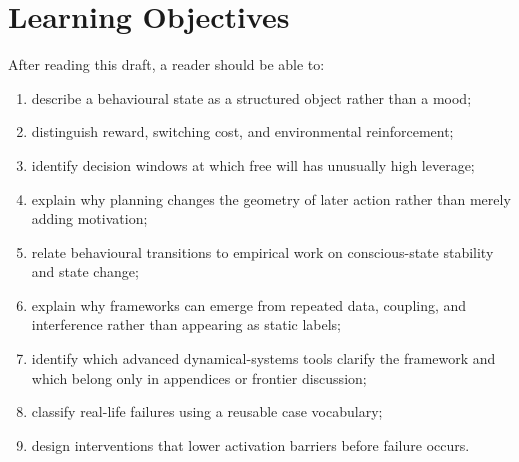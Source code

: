 \section{Learning Objectives}

After reading this draft, a reader should be able to:
\begin{enumerate}[nosep]
  \item describe a behavioural state as a structured object rather than a mood;
  \item distinguish reward, switching cost, and environmental reinforcement;
  \item identify decision windows at which free will has unusually high
        leverage;
  \item explain why planning changes the geometry of later action rather than
        merely adding motivation;
  \item relate behavioural transitions to empirical work on conscious-state
        stability and state change;
  \item explain why frameworks can emerge from repeated data, coupling, and
        interference rather than appearing as static labels;
  \item identify which advanced dynamical-systems tools clarify the framework
        and which belong only in appendices or frontier discussion;
  \item classify real-life failures using a reusable case vocabulary;
  \item design interventions that lower activation barriers before failure
        occurs.
\end{enumerate}
